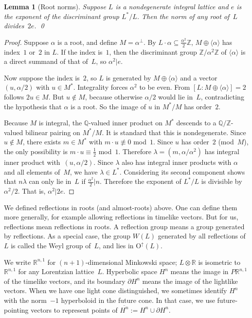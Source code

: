 \documentclass[12pt]{amsart}
\def\gend#1{\langle#1\rangle}
\def\R{\mathbb{R}}
\def\O{\mathrm{O}}
\def\Oup{\O^{\uparrow}}
\def\Z{\mathbb{Z}}
\def\Q{\mathbb{Q}}
\def\tensor{\otimes}
\def\sset{\subseteq}
\def\cong{\equiv}
\numberwithin{theorem}{section}
\numberwithin{equation}{section}
\numberwithin{figure}{section}
\newtheorem{lemma}[theorem]{Lemma}
\theoremstyle{remark}
\begin{document}
\begin{lemma}[Root norms]
    \label{LemRootNorms}
    Suppose $L$ is a nondegenerate integral lattice and $e$ is the
    exponent of the discriminant group $L^*/L$.  
    Then the norm of any root of~$L$
    divides~$2e$.
    \qed
\end{lemma}

\begin{proof}
    Suppose $\alpha$ is a root, and  define $M=\alpha^\perp$.  By
    $L\cdot\alpha\sset\frac{\alpha^2}{2}\Z$,
    $M\oplus\gend{\alpha}$
    has index~$1$ or~$2$ in $L$.  If the index is~$1$, then 
the discriminant group $\Z/\alpha^2\Z$ of $\gend{\alpha}$
    is a direct summand of that of~$L$, so  $\alpha^2|e$.

    Now suppose the index is~$2$,
    so $L$ is generated by $M\oplus\gend{\alpha}$ and a vector
    $(u,\alpha/2)$ with $u\in M^*$.  
    Integrality forces $\alpha^2$ to be even.
    From $[L:M\oplus\gend{\alpha}]=2$
    follows $2u\in M$.
    But 
    $u\notin M$,  because otherwise $\alpha/2$ would
    lie in~$L$, contradicting the hypothesis that $\alpha$ is a root.
    So the image of $u$ in $M^*/M$ has order~$2$.
    
    Because $M$ is integral, the $\Q$-valued
    inner product on $M^*$ descends to a $\Q/\Z$-valued 
    bilinear pairing on $M^*/M$.  It is standard that this
    is nondegenerate.  Since $u\notin M$,
    there exists $m\in M^*$ with $m\cdot u\not\cong0$ mod~$1$.
    Since $u$ has order~$2$ (mod~$M$), the only
    possibility is $m\cdot u\cong\frac12$ 
    mod~$1$.
    Therefore $\lambda=(m,\alpha/\alpha^2)$ has integral inner product
    with~$(u,\alpha/2)$.  Since $\lambda$ also has integral inner
    products with $\alpha$ and all elements of~$M$, we have $\lambda\in L^*$.
    Considering its second component shows that 
    $n\lambda$ 
    can only lie in~$L$ if $\frac{\alpha^2}{2}|n$.
    Therefore the exponent of $L^*/L$ is divisible by $\alpha^2/2$.
    That is, $\alpha^2|2e$.
\end{proof}

We defined reflections in roots (and almost-roots) above.  One can 
define them more generally, for example allowing reflections in timelike vectors.
But for us, reflections mean reflections in roots.  A reflection group
means a group generated by reflections.  As a special case, the group $W(L)$
generated by all reflections of~$L$ is called the Weyl group of~$L$, and lies
in $\Oup(L)$.  

We write $\R^{n,1}$ for $(n+1)$-dimensional Minkowski space; $L\tensor\R$
is isometric to $\R^{n,1}$ for any Lorentzian lattice~$L$.  Hyperbolic
space $H^n$ means the image in $P\R^{n,1}$ of the timelike vectors, and its
boundary $\partial H^n$ means the image of the lightlike vectors.  
When we have one light cone distinguished, we sometimes identify $H^n$ with
the norm~$-1$ hyperboloid in the future cone.  In that case, we use 
future-pointing vectors to represent points of $\overline{H^n}:=H^n\cup\partial H^n$.  
\end{document}
